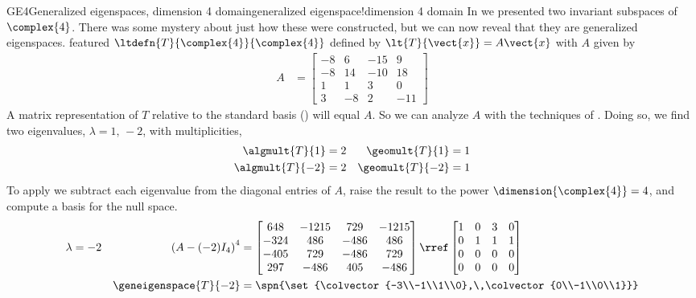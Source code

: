 \begin{example}{GE4}{Generalized eigenspaces, dimension 4 domain}{generalized eigenspace!dimension 4 domain}
In  we presented two invariant subspaces of $\complex{4}$.  There was some mystery about just how these were constructed, but we can now reveal that they are generalized eigenspaces.   featured $\ltdefn{T}{\complex{4}}{\complex{4}}$ defined by $\lt{T}{\vect{x}}=A\vect{x}$ with $A$ given by
%
\begin{align*}
A&=
\begin{bmatrix}
 -8 & 6 & -15 & 9 \\
 -8 & 14 & -10 & 18 \\
 1 & 1 & 3 & 0 \\
 3 & -8 & 2 & -11
\end{bmatrix}
\end{align*}
%
A matrix representation of $T$ relative to the standard basis () will equal $A$.  So we can analyze $A$ with the techniques of .  Doing so, we find two eigenvalues, $\lambda=1,\,-2$, with multiplicities,
%
\begin{align*}
\algmult{T}{1}&=2  &  \geomult{T}{1}&=1\\
\algmult{T}{-2}&=2  &  \geomult{T}{-2}&=1\\
\end{align*}
%
To apply  we subtract each eigenvalue from the diagonal entries of $A$, raise the result to the power $\dimension{\complex{4}}=4$, and compute a basis for the null space.
%
\begin{align*}
\lambda&=-2
&
\left(A-(-2)I_4\right)^4
&=
\begin{bmatrix}
 648 & -1215 & 729 & -1215 \\
 -324 & 486 & -486 & 486 \\
 -405 & 729 & -486 & 729 \\
 297 & -486 & 405 & -486
\end{bmatrix}
\rref
\begin{bmatrix}
 1 & 0 & 3 & 0 \\
 0 & 1 & 1 & 1 \\
 0 & 0 & 0 & 0 \\
 0 & 0 & 0 & 0
\end{bmatrix}\\
%
&&
\geneigenspace{T}{-2}
&=\spn{\set{\colvector{-3\\-1\\1\\0},\,\colvector{0\\-1\\0\\1}}}\\

\end{align*}
\end{example}
